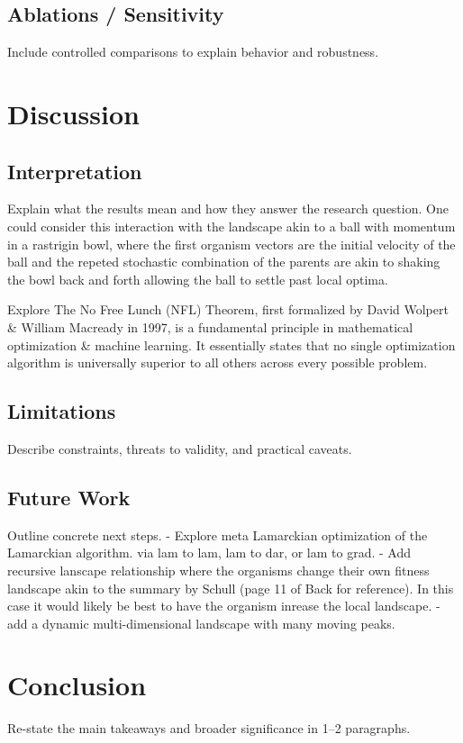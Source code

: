 \documentclass[11pt]{article}
\begin{document}
\subsection{Ablations / Sensitivity}
Include controlled comparisons to explain behavior and robustness.

\section{Discussion}
\subsection{Interpretation}
Explain what the results mean and how they answer the research question.
One could consider this interaction with the landscape akin to a ball with momentum in a rastrigin bowl, where the first organism vectors are the initial velocity of the ball and the repeted stochastic combination of the parents are akin to shaking the bowl back and forth allowing the ball to settle past local optima.

Explore The No Free Lunch (NFL) Theorem, first formalized by David Wolpert \& William Macready in 1997, is a fundamental principle in mathematical optimization \& machine learning. It essentially states that no single optimization algorithm is universally superior to all others across every possible problem.

\subsection{Limitations}
Describe constraints, threats to validity, and practical caveats.

\subsection{Future Work}
Outline concrete next steps.
- Explore meta Lamarckian optimization of the Lamarckian algorithm. via lam to lam, lam to dar, or lam to grad.
- Add recursive lanscape relationship where the organisms change their own fitness landscape akin to the summary by Schull (page  11 of Back for reference). In this case it would likely be best to have the organism inrease the local landscape. 
- add a dynamic multi-dimensional landscape with many moving peaks.

\section{Conclusion}
Re-state the main takeaways and broader significance in 1--2 paragraphs.
\end{document}
